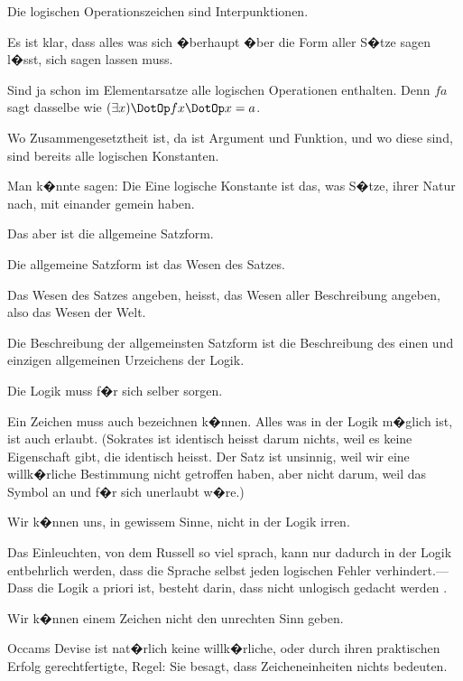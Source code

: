 \begin{propositions}
{Die logischen Operationszeichen sind Interpunktionen.}


{Es ist klar, dass alles was sich �berhaupt  �ber die Form aller S�tze sagen
l�sst, sich  sagen lassen muss.

Sind ja schon im Elementarsatze alle logischen
\enlargethispage{1pt} %
Operationen enthalten. Denn \glqq{}$fa$\grqq{} sagt dasselbe
wie \glqq{}$(\exists x) \DotOp fx \DotOp x = a$\grqq{}.

Wo Zusammengesetztheit ist, da ist Argument
und Funktion, und wo diese sind, sind bereits alle
logischen Konstanten.

Man k�nnte sagen: Die Eine logische Konstante
ist das, was  S�tze, ihrer Natur nach, mit
einander gemein haben.

Das aber ist die allgemeine Satzform.}


{Die allgemeine Satzform ist das Wesen des
Satzes.}


{Das Wesen des Satzes angeben, heisst, das
Wesen aller Beschreibung angeben, also das
Wesen der Welt.}


{Die Beschreibung der allgemeinsten Satzform
ist die Beschreibung des einen und einzigen
allgemeinen Urzeichens der Logik.}


{Die Logik muss f�r sich selber sorgen.

Ein  Zeichen muss auch bezeichnen
k�nnen. Alles was in der Logik m�glich ist, ist
auch erlaubt. (\glqq{}Sokrates ist identisch\grqq{} heisst darum
nichts, weil es keine Eigenschaft gibt, die
\glqq{}identisch\grqq{} heisst. Der Satz ist unsinnig, weil
wir eine willk�rliche Bestimmung nicht getroffen
haben, aber nicht darum, weil das Symbol an und
f�r sich unerlaubt w�re.)

Wir k�nnen uns, in gewissem Sinne, nicht in
der Logik irren.}


{Das Einleuchten, von dem Russell so viel
sprach, kann nur dadurch in der Logik entbehrlich
werden, dass die Sprache selbst jeden logischen
Fehler ver\-hin\-dert.---Dass die Logik a priori ist,
besteht darin, dass nicht unlogisch gedacht werden
.}


{Wir k�nnen einem Zeichen nicht den unrechten
Sinn geben.}


{Occams Devise ist nat�rlich keine willk�rliche,
oder durch ihren praktischen Erfolg gerechtfertigte,
Regel: Sie besagt, dass  Zeicheneinheiten
nichts bedeuten.

}
\end{propositions}
